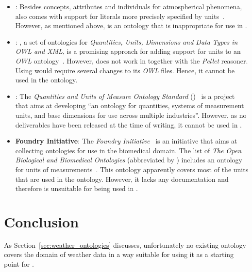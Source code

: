 \begin{itemize}
  \item \textbf{}: Besides concepts, attributes and individuals for atmospherical phenomena,  also comes with support for literals more precisely specified by units~\cite{SWEET1}. However, as mentioned above,  is an ontology that is inappropriate for use in \smarthomeweather.
  
  \item \textbf{}: , a set of ontologies for \emph{Quantities, Units, Dimensions and Data Types in OWL and XML}, is a promising approach for adding support for units to an \emph{OWL} ontology~\cite{QUDT}. However,  does not work in \protege together with the \emph{Pellet} reasoner. Using  would require several changes to its \emph{OWL} files. Hence, it cannot be used in the \smarthomeweather ontology.
  
  \item \textbf{}: The \emph{ Quantities and Units of Measure Ontology Standard} ()~\cite{QUOMOS} is a project that aims at developing ``an ontology for quantities, systems of measurement units, and base dimensions for use across multiple industries''. However, as no deliverables have been released at the time of writing, it cannot be used in \smarthomeweather.
  
  \item \textbf{ Foundry Initiative}: The \emph{ Foundry Initiative}~\cite{OBOFoundry} is an initiative that aims at collecting ontologies for use in the biomedical domain. The list of \emph{The Open Biological and Biomedical Ontologies} (abbreviated by ) includes an ontology for units of measurements~\cite{OBOUnits1,OBOUnits2}. This ontology apparently covers most of the units that are used in the \smarthomeweather ontology. However, it lacks any documentation and therefore is unsuitable for being used in \smarthomeweather.
\end{itemize}

\section{Conclusion}

As Section~\ref{sec:weather_ontologies} discusses, unfortunately no existing ontology covers the domain of weather data in a way suitable for using it as a starting point for \smarthomeweather.

